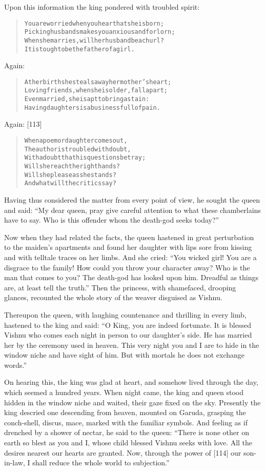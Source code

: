 \documentclass[article, twoside, 14pt]{memoir}
\renewenvironment{verbatim}{%
\begin{quote}%
\vskip -10pt%
\begin{alltt}\normalfont\large}{\end{alltt}%
\end{quote}%
\vskip -10pt
} %
\begin{document}
Upon this information the king pondered with troubled spirit:

\begin{verbatim}
You are worried when you hear that she is born;
Picking husbands makes you anxious and forlorn;
When she marries, will her husband be a churl?
It is tough to be the father of a girl.
\end{verbatim}
Again:

\begin{verbatim}
At her birth she steals away her mother's heart;
Loving friends, when she is older, fall apart;
Even married, she is apt to bring a stain:
Having daughters is a business full of pain.
\end{verbatim}
Again: [113]

\begin{verbatim}
When a poem or daughter comes out,
The author is troubled with doubt,
    With a doubt that his questions betray;
Will she reach the right hands?
Will she please as she stands?
    And what will the critics say?
\end{verbatim}
Having thus considered the matter from every point of view, he
sought the queen and said:
``My dear queen, pray give careful attention to what these chamberlains have to say. Who is this offender whom the death-god seeks today?''

Now when they had related the facts, the queen hastened in great
perturbation to the maiden's apartments and found her daughter with
lips sore from kissing and with telltale traces on her limbs. And
she cried:
``You wicked girl! You are a disgrace to the family! How could you throw your character away? Who is the man that comes to you? The death-god has looked upon him. Dreadful as things are, at least tell the truth.''
Then the princess, with shamefaced, drooping glances, recounted the
whole story of the weaver disguised as Vishnu.

Thereupon the queen, with laughing countenance and thrilling in
every limb, hastened to the king and said:
``O King, you are indeed fortunate. It is blessed Vishnu who comes each night in person to our daughter's side. He has married her by the ceremony used in heaven. This very night you and I are to hide in the window niche and have sight of him. But with mortals he does not exchange words.''

On hearing this, the king was glad at heart, and somehow lived
through the day, which seemed a hundred years. When night came, the
king and queen stood hidden in the window niche and waited, their
gaze fixed on the sky. Presently the king descried one descending
from heaven, mounted on Garuda, grasping the conch-shell, discus,
mace, marked with the familiar symbols. And feeling as if drenched
by a shower of nectar, he said to the queen:
``There is none other on earth so blest as you and I, whose child blessed Vishnu seeks with love. All the desires nearest our hearts are granted. Now, through the power of [114] our son-in-law, I shall reduce the whole world to subjection.''
\end{document}
